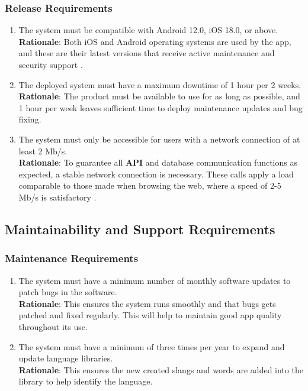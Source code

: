 \subsubsection{Release Requirements}
\label{ssub:release_requirements}
\begin{enumerate}[{OE-R}1. ]
	\item The system must be compatible with Android 12.0, iOS 18.0, or above.
	\\ \textbf{Rationale}: Both iOS and Android operating systems are used by the app, and these are their latest versions that receive active maintenance and security support \cite{EndOfLife2025_Android,EndOfLife2025_iOS}. 
	\item The deployed system must have a maximum downtime of 1 hour per 2 weeks.
	\\ \textbf{Rationale}: The product must be available to use for as long as possible, and 1 hour per week leaves sufficient time to deploy maintenance updates and bug fixing.
	\item The system must only be accessible for users with a network connection of at least 2 Mb/s.
	\\ \textbf{Rationale}: To guarantee all \textbf{API} and database communication functions as expected, a stable network connection is necessary. These calls apply a load comparable to those made when browsing the web, where a speed of 2-5 Mb/s is satisfactory \cite{Speedtest2025}.
\end{enumerate}


\subsection{Maintainability and Support Requirements}
\label{sub:maintainability_and_support_requirements}

\subsubsection{Maintenance Requirements}
\label{ssub:maintenance_requirements}
\begin{enumerate}[{MS-M}1. ]
	\item The system must have a minimum number of monthly software updates to patch bugs in the software.  
	\\ \textbf{Rationale}: This ensures the system runs smoothly and that bugs gets patched and fixed regularly. This will help to maintain 	good app quality throughout its use.
	\item The system must have a minimum of three times per year to expand and update language libraries. 
	\\ \textbf{Rationale}: This ensures the new created slangs and words are added into the library to help identify the language.
\end{enumerate}

